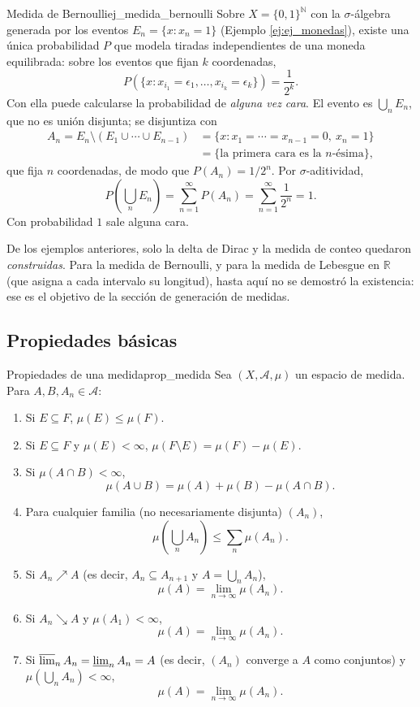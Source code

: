 \documentclass[11pt, a4paper]{article}
\begin{document}
\begin{ejemplo}{Medida de Bernoulli}{ej_medida_bernoulli}
Sobre $X = \{0,1\}^{\mathbb{N}}$ con la $\sigma$-álgebra generada por los eventos
$E_n = \{x : x_n = 1\}$ (Ejemplo \ref{ej:ej_monedas}), existe una única probabilidad $P$ que
modela tiradas independientes de una moneda equilibrada: sobre los eventos que fijan $k$
coordenadas,
$$ P(\{x : x_{i_1} = \epsilon_1, \dots, x_{i_k} = \epsilon_k\}) = \frac{1}{2^k}. $$
Con ella puede calcularse la probabilidad de \emph{alguna vez cara}. El evento es
$\bigcup_n E_n$, que no es unión disjunta; se disjuntiza con
\begin{align*}
A_n = E_n \setminus (E_1 \cup \cdots \cup E_{n-1})
&= \{x : x_1 = \cdots = x_{n-1} = 0, \ x_n = 1\} \\
&= \{\text{la primera cara es la } n\text{-ésima}\},
\end{align*}
que fija $n$ coordenadas, de modo que $P(A_n) = 1/2^n$. Por $\sigma$-aditividad,
$$ P\!\left(\bigcup_n E_n\right) = \sum_{n=1}^\infty P(A_n) = \sum_{n=1}^\infty \frac{1}{2^n}
= 1. $$
Con probabilidad $1$ sale alguna cara.
\end{ejemplo}

\obs De los ejemplos anteriores, solo la delta de Dirac y la medida de conteo quedaron
\emph{construidas}. Para la medida de Bernoulli, y para la medida de Lebesgue en $\mathbb{R}$
(que asigna a cada intervalo su longitud), hasta aquí no se demostró la existencia: ese es el
objetivo de la sección de generación de medidas.

\subsection{Propiedades básicas}

\begin{teorema}{Propiedades de una medida}{prop_medida}
Sea $(X, \mathcal{A}, \mu)$ un espacio de medida. Para $A, B, A_n \in \mathcal{A}$:
\begin{enumerate}
    \item Si $E \subseteq F$, $\mu(E) \le \mu(F)$.
    \item Si $E \subseteq F$ y $\mu(E) < \infty$, $\mu(F \setminus E) = \mu(F) - \mu(E)$.
    \item Si $\mu(A \cap B) < \infty$,
    $$ \mu(A \cup B) = \mu(A) + \mu(B) - \mu(A \cap B). $$
    \item Para cualquier familia (no necesariamente disjunta) $(A_n)$,
    $$ \mu\!\left(\bigcup_n A_n\right) \le \sum_n \mu(A_n). $$
    \item Si $A_n \nearrow A$ (es decir, $A_n \subseteq A_{n+1}$ y $A = \bigcup_n A_n$),
    $$ \mu(A) = \lim_{n \to \infty} \mu(A_n). $$
    \item Si $A_n \searrow A$ y $\mu(A_1) < \infty$,
    $$ \mu(A) = \lim_{n \to \infty} \mu(A_n). $$
    \item Si $\varlimsup_n A_n = \varliminf_n A_n = A$ (es decir, $(A_n)$ converge a $A$ como
    conjuntos) y $\mu\!\left(\bigcup_n A_n\right) < \infty$,
    $$ \mu(A) = \lim_{n \to \infty} \mu(A_n). $$
\end{enumerate}
\end{teorema}
\end{document}
